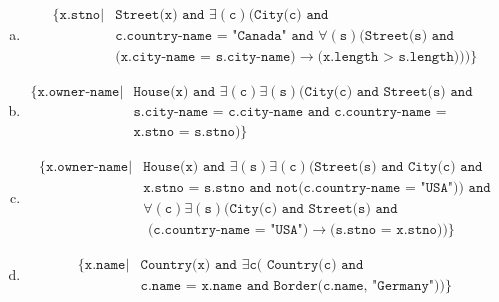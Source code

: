 \documentclass[11pt]{article}
\def\code#1{\texttt{#1}}
\def\c#1{\texttt{#1}}
\def\expr#1#2{\{\code{#1} | #2\}}
\begin{document}
  \begin{enumerate}[a.]

    \item
      \begin{equation*}
      \begin{aligned}
        \expr{x.stno} {
          &\c{Street(x) and } \exists(\c{c})(\c{City(c) and} \\
          &\c{c.country-name = "Canada" and } \forall(\c{s})(\c{Street(s) and} \\ 
          &\c{(x.city-name = s.city-name)} \to \c{(x.length > s.length)}
        ))}
      \end{aligned}
      \end{equation*}

    \item 
      \begin{equation*}
      \begin{aligned}
        \expr{x.owner-name} {
          &\c{House(x) and } \exists(\c{c})\exists(\c{s}) (\c{City(c) and Street(s) and} \\
          &\c{s.city-name = c.city-name and c.country-name = "Canada"} \\
          &\c{x.stno = s.stno}
        )}
      \end{aligned}
      \end{equation*}

    \item
      \begin{equation*}
      \begin{aligned}
        \expr{x.owner-name} {
          &\c{House(x) and } \exists(\c{s})\exists(\c{c})(\c{Street(s) and City(c) and} \\
          &\c{x.stno = s.stno and not(c.country-name = "USA")}) \c{ and}\\
          &\forall(\c{c})\exists(\c{s})(\c{City(c) and Street(s) and} \\
          &\c{    (c.country-name = "USA")} \to \c{(s.stno = x.stno)})
        }
      \end{aligned}
      \end{equation*}

    \item
      \begin{equation*}
      \begin{aligned}
        \expr{x.name} {
          &\c{Country(x) and } \exists{\c{c}} (\c{ Country(c) and} \\
          &\c{c.name = x.name and Border(c.name, "Germany")})
        }
      \end{aligned}
      \end{equation*}


\end{enumerate}
\end{document}
